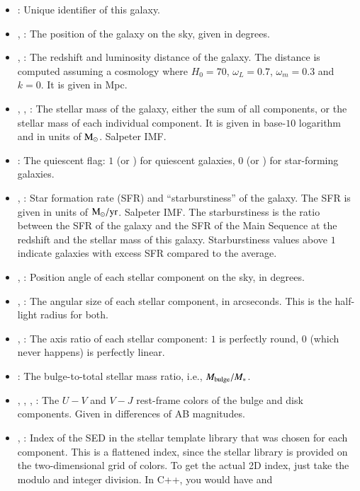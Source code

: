 \begin{itemize}
\item {}: Unique identifier of this galaxy.
\item {}, : The position of the galaxy on the sky, given in degrees.
\item {}, : The redshift and luminosity distance of the galaxy. The distance is computed assuming a cosmology where $H_0=70$, $\omega_L=0.7$, $\omega_m = 0.3$ and $k=0$. It is given in Mpc.
\item {}, , : The stellar mass of the galaxy, either the sum of all components, or the stellar mass of each individual component. It is given in base-$10$ logarithm and in units of ${\rm M}_\odot$. Salpeter IMF.
\item {}: The quiescent flag: $1$ (or ) for quiescent galaxies, $0$ (or ) for star-forming galaxies.
\item {}, : Star formation rate (SFR) and ``starburstiness'' of the galaxy. The SFR is given in units of ${\rm M}_\odot/{\rm yr}$. Salpeter IMF. The starburstiness is the ratio between the SFR of the galaxy and the SFR of the Main Sequence at the redshift and the stellar mass of this galaxy. Starburstiness values above $1$ indicate galaxies with excess SFR compared to the average.
\item {}, : Position angle of each stellar component on the sky, in degrees.
\item {}, : The angular size of each stellar component, in arcseconds. This is the half-light radius for both.
\item {}, : The axis ratio of each stellar component: $1$ is perfectly round, $0$ (which never happens) is perfectly linear.
\item {}: The bulge-to-total stellar mass ratio, i.e., $M_{\rm bulge}/M_*$.
\item {}, , , : The $U-V$ and $V-J$ rest-frame colors of the bulge and disk components. Given in differences of AB magnitudes.
\item {}, : Index of the SED in the stellar template library that was chosen for each component. This is a flattened index, since the stellar library is provided on the two-dimensional grid of colors. To get the actual 2D index, just take the modulo and integer division. In C++, you would have  and \cppinline{ivj = opt_sed%
}
\end{itemize}
